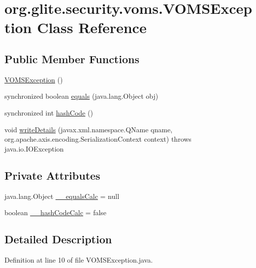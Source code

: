 \hypertarget{classorg_1_1glite_1_1security_1_1voms_1_1VOMSException}{
\section{org.glite.security.voms.VOMSException Class Reference}
\label{classorg_1_1glite_1_1security_1_1voms_1_1VOMSException}
}
\subsection*{Public Member Functions}
\begin{DoxyCompactItemize}
\item 
\hyperlink{classorg_1_1glite_1_1security_1_1voms_1_1VOMSException_a00d28bd5e41c3f05dc93a6a30111c5a9}{VOMSException} ()
\item 
synchronized boolean \hyperlink{classorg_1_1glite_1_1security_1_1voms_1_1VOMSException_a6e0d3355c36952510f2d2bde6ac598ab}{equals} (java.lang.Object obj)
\item 
synchronized int \hyperlink{classorg_1_1glite_1_1security_1_1voms_1_1VOMSException_a8f9da552e68282e94c8a7167c52bea7f}{hashCode} ()
\item 
void \hyperlink{classorg_1_1glite_1_1security_1_1voms_1_1VOMSException_a1f0e7b3d87b5817394ca0b53a1f97d00}{writeDetails} (javax.xml.namespace.QName qname, org.apache.axis.encoding.SerializationContext context)  throws java.io.IOException 
\end{DoxyCompactItemize}
\subsection*{Private Attributes}
\begin{DoxyCompactItemize}
\item 
java.lang.Object \hyperlink{classorg_1_1glite_1_1security_1_1voms_1_1VOMSException_ab6440c26ca2767f73c23cf7f7762bd8f}{\_\-\_\-equalsCalc} = null
\item 
boolean \hyperlink{classorg_1_1glite_1_1security_1_1voms_1_1VOMSException_a7e4179821de4dcaab56ecd6d4ee0babb}{\_\-\_\-hashCodeCalc} = false
\end{DoxyCompactItemize}


\subsection{Detailed Description}


Definition at line 10 of file VOMSException.java.



